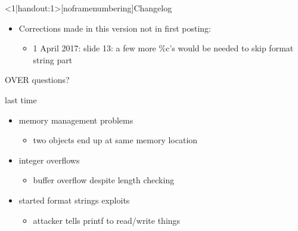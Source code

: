 \begin{frame}
    \titlepage
\end{frame}


{
\begin{frame}<1|handout:1>[noframenumbering]{Changelog}
    \begin{itemize}
        \item Corrections made in this version not in first posting:
        \begin{itemize}
        \item 1 April 2017: slide 13: a few more \%c's would be needed to skip format string part
        \end{itemize}
    \end{itemize}
\end{frame}
}


\begin{frame}{OVER questions?}
\end{frame}

\begin{frame}{last time}
    \begin{itemize}
        \item memory management problems
        \begin{itemize}
            \item two objects end up at same memory location
        \end{itemize}
        \item integer overflows
        \begin{itemize}
            \item buffer overflow despite length checking
        \end{itemize}
        \item started format strings exploits
        \begin{itemize}
            \item attacker tells printf to read/write things
        \end{itemize}
    \end{itemize}
\end{frame}


